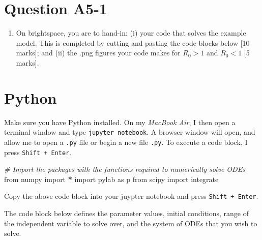 \documentclass[]{book}
\newenvironment{Shaded}{\begin{snugshade}}{\end{snugshade}}
\newcommand{\ImportTok}[1]{{#1}}
\newcommand{\CommentTok}[1]{\textcolor[rgb]{0.56,0.35,0.01}{\textit{{#1}}}}
\newcommand{\OperatorTok}[1]{\textcolor[rgb]{0.81,0.36,0.00}{\textbf{{#1}}}}
\newcommand{\NormalTok}[1]{{#1}}
\providecommand{\tightlist}{%
  \setlength{\itemsep}{0pt}\setlength{\parskip}{0pt}}
\begin{document}
\section{Question A5-1}\label{question-a5-1}

\begin{enumerate}
\def\labelenumi{\arabic{enumi}.}
\tightlist
\item
  On brightspace, you are to hand-in: (i) your code that solves the
  example model. This is completed by cutting and pasting the code
  blocks below {[}10 marks{]}; and (ii) the .png figures your code makes
  for \(R_0 > 1\) and \(R_0 < 1\) {[}5 marks{]}.
\end{enumerate}

\section{Python}\label{python}

Make sure you have Python installed. On my \emph{MacBook Air}, I then
open a terminal window and type \texttt{jupyter\ notebook}. A browser
window will open, and allow me to open a \texttt{.py} file or begin a
new file \texttt{.py}. To execute a code block, I press
\texttt{Shift\ +\ Enter}.

\begin{Shaded}
\begin{Highlighting}[]
\CommentTok{# Import the packages with the functions required to numerically solve ODEs}
\ImportTok{from} \NormalTok{numpy }\ImportTok{import} \OperatorTok{*}
\ImportTok{import} \NormalTok{pylab }\ImportTok{as} \NormalTok{p}
\ImportTok{from} \NormalTok{scipy }\ImportTok{import} \NormalTok{integrate}
\end{Highlighting}
\end{Shaded}

Copy the above code block into your juypter notebook and press
\texttt{Shift\ +\ Enter}.

The code block below defines the parameter values, initial conditions,
range of the independent variable to solve over, and the system of ODEs
that you wish to solve.
\end{document}
